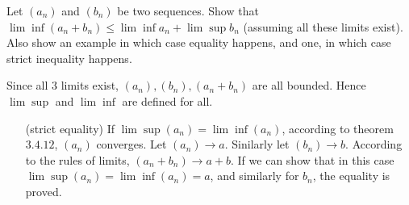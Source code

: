 \documentclass[boxes, qed]{homework}
\begin{document}
\begin{problem}Let $(a_n)$ and $(b_n)$ be two sequences. Show that \\
  $\lim \inf (a_n+b_n) \le \lim \inf a_n + \lim \sup b_n$ (assuming all these limits exist). 
  Also show an example in which case equality happens, and one, in which case strict inequality happens.
\end{problem}
\begin{solution}Since all 3 limits exist, $(a_n), (b_n), (a_n+b_n)$ are all bounded. Hence
  $\lim\sup$ and $\lim\inf$ are defined for all.
  \begin{enumerate}
  \item[(strict equality)] If $\lim \sup (a_n) = \lim \inf (a_n)$, according to theorem $3.4.12$,
    $(a_n)$ converges. Let $(a_n)\rightarrow{a}$. Sinilarly let $(b_n)\rightarrow{b}$.
    According to the rules of limits, $(a_n+b_n)\rightarrow{a+b}$. If we can show that in this case
    $\lim \sup (a_n) = \lim \inf (a_n) = a$, and similarly for $b_n$, the equality is proved.
  \end{enumerate}
\end{solution}
\end{document}
